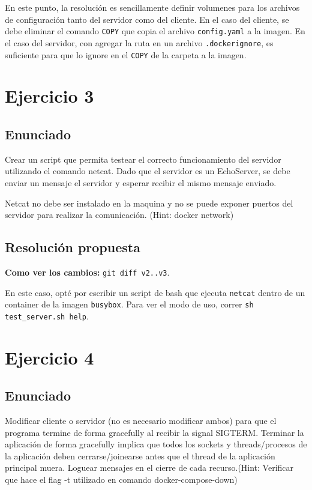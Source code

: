 \documentclass{article}
\begin{document}
En este punto, la resolución es sencillamente definir volumenes\cite{DockerVolumes} para los archivos de configuración tanto del servidor como del cliente. En el caso del cliente, se debe eliminar el comando \texttt{COPY} que copia el archivo \texttt{config.yaml} a la imagen. En el caso del servidor, con agregar la ruta en un archivo \texttt{.dockerignore}\cite{dockerignore}, es suficiente para que lo ignore en el \texttt{COPY} de la carpeta a la imagen.

\section{Ejercicio 3}

\subsection{Enunciado}
Crear un script que permita testear el correcto funcionamiento del servidor utilizando el comando netcat. Dado que el servidor es un EchoServer, se debe enviar un mensaje el servidor y esperar recibir el mismo mensaje enviado.

Netcat no debe ser instalado en la maquina y no se puede exponer puertos del servidor para realizar la comunicación. (Hint: docker network)

\subsection{Resolución propuesta}

\textbf{Como ver los cambios: }\texttt{git diff v2..v3}.

En este caso, opté por escribir un script de bash que ejecuta \texttt{netcat} dentro de un container de la imagen \texttt{busybox}. Para ver el modo de uso, correr \texttt{sh test\_server.sh \-\-help}.

\section{Ejercicio 4}

\subsection{Enunciado}
Modificar cliente o servidor (no es necesario modificar ambos) para que el programa termine de forma gracefully al recibir la signal SIGTERM. Terminar la aplicación de forma gracefully implica que todos los sockets y threads/procesos de la aplicación deben cerrarse/joinearse antes que el thread de la aplicación principal muera. Loguear mensajes en el cierre de cada recurso.(Hint: Verificar que hace el flag -t utilizado en comando docker-compose-down)
\end{document}
